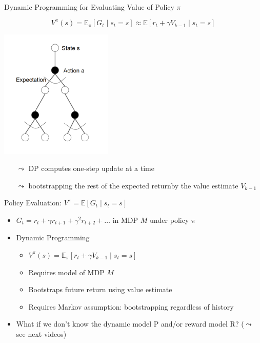 \begin{frame}[c]{Dynamic Programming for Evaluating Value of Policy $\pi$}

$$V^\pi (s) = \mathbb{E}_\pi [G_t \mid s_t = s] \approx \mathbb{E} [r_t + \gamma V_{k-1} \mid s_t = s]$$

\begin{center}
	\includegraphics[width=0.4\textwidth]{images/state_action_graph2.png}
\end{center}

\vspace{-1cm}
\pause
\begin{itemize}
	\item[$\leadsto$] DP computes one-step update at a time
	\item[$\leadsto$] bootstrapping the rest of the expected return\newline by the value estimate $V_{k-1}$
\end{itemize}

\end{frame}
\begin{frame}[c]{Policy Evaluation: $V^\pi = \mathbb{E}[G_t \mid s_t = s]$}

\begin{itemize}
	\item $G_t = r_t + \gamma r_{t+1} + \gamma^2 r_{t+2} + \ldots$ in MDP $M$ under policy $\pi$
	\item Dynamic Programming
	\begin{itemize}
		\item $V^\pi (s)  = \mathbb{E}_\pi [r_t + \gamma V_{k-1} \mid s_t = s]$
		\item \alert{Requires model of MDP $M$}
		\item Bootstraps future return using value estimate
		\item Requires Markov assumption: bootstrapping regardless of history
	\end{itemize}
	\pause
	\medskip
	\item What if we don't know the dynamic model P and/or reward model R? ($\leadsto$ see next videos)
\end{itemize}

\end{frame}

